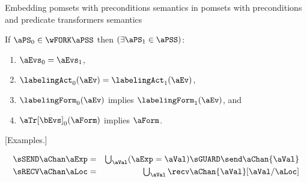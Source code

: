 Embedding pomsets with preconditions semantics in pomsets with preconditions and predicate transformers semantics  
\begin{definition}
  If $\aPS_0 \in \wFORK\aPSS$ then
  $(\exists\aPS_1\in\aPSS)$:
  \begin{enumerate}
  \item $\aEvs_0=\aEvs_1$,
  \item $\labelingAct_0(\aEv) = \labelingAct_1(\aEv)$,
  \item $\labelingForm_0(\aEv)$ implies $\labelingForm_1(\aEv)$, and
  \item $\aTr[\bEvs]_0(\aForm)$ implies $\aForm$.
  \end{enumerate}
\end{definition}

[Examples.]

\begin{eqnarray*}
  \sSEND\aChan\aExp & = &
  \textstyle\bigcup_\aVal (\aExp=\aVal) \sGUARD \send\aChan{\aVal}
\\
  \sRECV\aChan\aLoc & = &
  \textstyle\bigcup_\aVal \recv\aChan{\aVal}[\aVal/\aLoc]
\end{eqnarray*}

